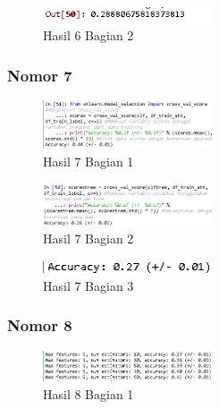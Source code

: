 
\begin{figure}[H]
\centerline{\includegraphics[width=5cm]{figures/1174089/3/praktek27.PNG}}
\caption{Hasil 6 Bagian 2}
\label{labelgambar}
\end{figure}

\subsubsection{Nomor 7}
\hfill\break

\begin{figure}[H]
\centerline{\includegraphics[width=5cm]{figures/1174089/3/praktek28.PNG}}
\caption{Hasil 7 Bagian 1}
\label{labelgambar}
\end{figure}


\begin{figure}[H]
\centerline{\includegraphics[width=5cm]{figures/1174089/3/praktek29.PNG}}
\caption{Hasil 7 Bagian 2}
\label{labelgambar}
\end{figure}


\begin{figure}[H]
\centerline{\includegraphics[width=5cm]{figures/1174089/3/praktek30.PNG}}
\caption{Hasil 7 Bagian 3}
\label{labelgambar}
\end{figure}

\subsubsection{Nomor 8}
\hfill\break

\begin{figure}[H]
\centerline{\includegraphics[width=5cm]{figures/1174089/3/praktek31.PNG}}
\caption{Hasil 8 Bagian 1}
\label{labelgambar}
\end{figure}

